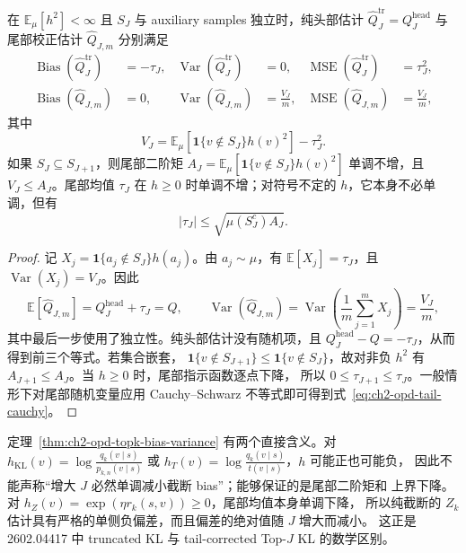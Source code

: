 \begin{theorem}
\label{thm:ch2-opd-topk-bias-variance}
在 $\mathbb E_\mu[h^2]<\infty$ 且 $S_J$ 与 auxiliary samples 独立时，纯头部估计 $\widehat Q_J^{\mathrm{tr}}=Q_J^{\mathrm{head}}$ 与尾部校正估计 $\widehat Q_{J,m}$ 分别满足
\begin{align}
\operatorname{Bias}(\widehat Q_J^{\mathrm{tr}})&=-\tau_J,&
\operatorname{Var}(\widehat Q_J^{\mathrm{tr}})&=0,&
\operatorname{MSE}(\widehat Q_J^{\mathrm{tr}})&=\tau_J^2,\\
\operatorname{Bias}(\widehat Q_{J,m})&=0,&
\operatorname{Var}(\widehat Q_{J,m})&=\frac{V_J}{m},&
\operatorname{MSE}(\widehat Q_{J,m})&=\frac{V_J}{m},
\end{align}
其中
\begin{equation}
V_J=\mathbb E_\mu\left[\mathbf 1\{v\notin S_J\}h(v)^2\right]-\tau_J^2.
\label{eq:ch2-opd-tail-variance}
\end{equation}
如果 $S_J\subseteq S_{J+1}$，则尾部二阶矩 $A_J=\mathbb E_\mu[\mathbf 1\{v\notin S_J\}h(v)^2]$ 单调不增，且 $V_J\le A_J$。尾部均值 $\tau_J$ 在 $h\ge0$ 时单调不增；对符号不定的 $h$，它本身不必单调，但有
\begin{equation}
|\tau_J|\le \sqrt{\mu(S_J^c)A_J}.
\label{eq:ch2-opd-tail-cauchy}
\end{equation}
\end{theorem}

\begin{proof}
记 $X_j=\mathbf 1\{a_j\notin S_J\}h(a_j)$。由 $a_j\sim\mu$，有 $\mathbb E[X_j]=\tau_J$，且 $\operatorname{Var}(X_j)=V_J$。因此
\begin{equation}
\mathbb E[\widehat Q_{J,m}]
 =Q_J^{\mathrm{head}}+\tau_J=Q,
\qquad
\operatorname{Var}(\widehat Q_{J,m})
 =\operatorname{Var}\left(\frac1m\sum_{j=1}^mX_j\right)
 =\frac{V_J}{m},
\end{equation}
其中最后一步使用了独立性。纯头部估计没有随机项，且 $Q_J^{\mathrm{head}}-Q=-\tau_J$，从而得到前三个等式。若集合嵌套， $\mathbf 1\{v\notin S_{J+1}\}\le\mathbf 1\{v\notin S_J\}$，故对非负 $h^2$ 有 $A_{J+1}\le A_J$。当 $h\ge0$ 时，尾部指示函数逐点下降， 所以 $0\le\tau_{J+1}\le\tau_J$。一般情形下对尾部随机变量应用 Cauchy--Schwarz 不等式即可得到式~\eqref{eq:ch2-opd-tail-cauchy}。
\end{proof}

定理~\ref{thm:ch2-opd-topk-bias-variance} 有两个直接含义。对 $h_{\mathrm{KL}}(v)=\log\frac{q_k(v\mid s)}{p_{k,n}(v\mid s)}$ 或 $h_T(v)=\log\frac{q_k(v\mid s)}{t(v\mid s)}$，$h$ 可能正也可能负， 因此不能声称“增大 $J$ 必然单调减小截断 bias”；能够保证的是尾部二阶矩和 上界下降。对 $h_Z(v)=\exp(\eta r_k(s,v))\ge0$，尾部均值本身单调下降， 所以纯截断的 $Z_k$ 估计具有严格的单侧负偏差，而且偏差的绝对值随 $J$ 增大而减小。 这正是 2602.04417 中 truncated KL 与 tail-corrected Top-$J$ KL 的数学区别。

